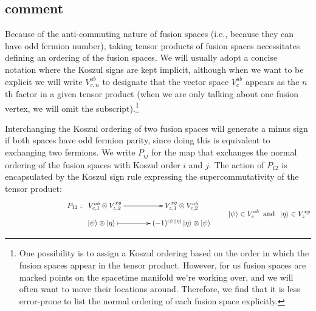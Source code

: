 \documentclass[12pt,a4paper]{article}
\newcommand{\tp}{\otimes}
\newcommand{\ket}[1]{\ensuremath{\left|#1\right\rangle}}
\begin{document}
 



 
\subsection{comment}
Because of the anti-commuting nature of fusion spaces (i.e., because they can have odd fermion number), 
taking tensor products of fusion spaces necessitates defining an ordering 
of the fusion spaces. 
We will usually adopt a concise notation where the Koszul signs are kept implicit, 
although when we want to be explicit we will write $V^{ab}_{c,n}$ to designate that the vector space 
$V^{ab}_c$ appears as the $n$th factor in a given tensor product (when we are only talking about one fusion vertex, 
we will omit the subscript).\footnote{One 
possibility is to assign a Koszul ordering based on the order in which the fusion spaces appear in the tensor product. 
However, for us fusion spaces are marked points on the spacetime manifold we're working over, and we will often want to move their locations around. 
Therefore, we find that it is less error-prone to list the normal ordering of each fusion space explicitly.}

Interchanging the Koszul ordering of two fusion spaces will generate a minus sign if both spaces have odd fermion parity, 
since doing this is equivalent to exchanging two fermions. 
We write $P_{ij}$ for the map that exchanges the normal ordering of the fusion spaces with Koszul order $i$ and $j$. 
The action of $P_{12}$ is encapsulated by the Koszul sign rule expressing the supercommutativity of the tensor product:
\begin{align}
\vcenter{\xymatrix @!0 @M=1mm @C=42mm{
 &P_{12}: \; \;V^{ab}_{c,1} \tp V^{xy}_{z,2} \ar[r]            &  V^{xy}_{z,1} \tp V^{ab}_{c,2} \\
		  &\;\;\;\;\;\;\; \ket{\psi}\tp\ket{\eta}  \ar@{|->}[r] & (-1)^{|\psi| |\eta|} \ket{\eta} \tp \ket{\psi}
	}} \quad \quad \ket{\psi} \in V^{ab}_{c} \;\; \text{and} \;\;  \ket{\eta} \in V^{xy}_{z}
\end{align}
 
 

 
\end{document}
